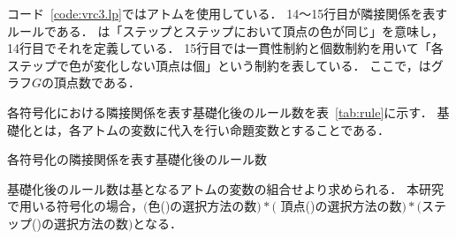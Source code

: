 コード~\ref{code:vrc3.lp}ではアトムを使用している．
14～15行目が隣接関係を表すルールである．
は「ステップとステップにおいて頂点の色が同じ」を意味し，
14行目でそれを定義している．
15行目では一貫性制約と個数制約を用いて「各ステップで色が変化しない頂点は個」という制約を表している．
ここで，はグラフ$G$の頂点数である．

各符号化における隣接関係を表す基礎化後のルール数を表~\ref{tab:rule}に示す．
基礎化とは，各アトムの変数に代入を行い命題変数とすることである．

\begin{table}[tb]
  \centering
  \caption{各符号化の隣接関係を表す基礎化後のルール数}
  
  \label{tab:rule}
\end{table}

基礎化後のルール数は基となるアトムの変数の組合せより求められる．
本研究で用いる符号化の場合，$($色()の選択方法の数$)*($
頂点()の選択方法の数$)*($ステップ()の選択方法の数$)$となる．

